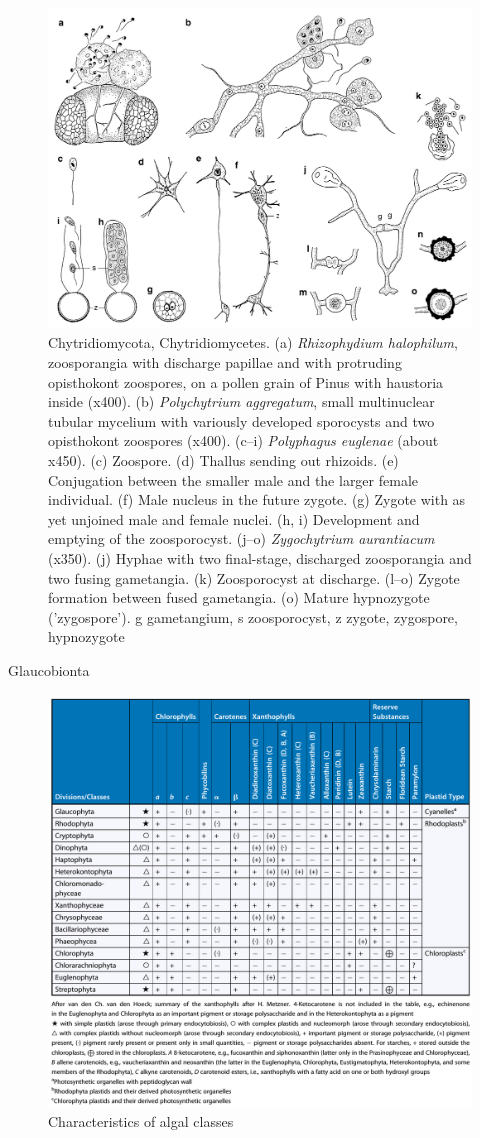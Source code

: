 \documentclass[ignorenonframetext,aspectratio=169]{beamer}
\begin{document}
\begin{frame}{}
\protect\hypertarget{section-13}{}

\begin{figure}
\includegraphics[width=0.4\linewidth]{./../images/chytridiomycota_structure} \caption{Chytridiomycota, Chytridiomycetes. (a) \textit{Rhizophydium halophilum}, zoosporangia with discharge papillae and with protruding opisthokont zoospores, on a pollen grain of Pinus with haustoria inside (x400). (b) \textit{Polychytrium aggregatum}, small multinuclear tubular mycelium with variously developed sporocysts and two opisthokont zoospores (x400). (c–i) \textit{Polyphagus euglenae} (about x450). (c) Zoospore. (d) Thallus sending out rhizoids. (e) Conjugation between the smaller male and the larger female individual. (f) Male nucleus in the future zygote. (g) Zygote with as yet unjoined male and female nuclei. (h, i) Development and emptying of the zoosporocyst. (j–o) \textit{Zygochytrium aurantiacum} (x350). (j) Hyphae with two final-stage, discharged zoosporangia and two fusing gametangia. (k) Zoosporocyst at discharge. (l–o) Zygote formation between fused gametangia. (o) Mature hypnozygote ('zygospore'). g gametangium, s zoosporocyst, z zygote, zygospore, hypnozygote}\label{fig:oomycota-peronosporales}
\end{figure}

\end{frame}

\begin{frame}{Glaucobionta}
\protect\hypertarget{glaucobionta}{}

\begin{figure}
\includegraphics[width=0.48\linewidth]{./../images/algal_classes} \caption{Characteristics of algal classes}\label{fig:glaucobionta}
\end{figure}

\end{frame}
\end{document}
